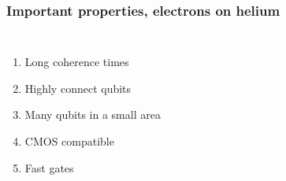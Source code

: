 \documentclass{beamer}
\begin{document}
\frame
    {
      \frametitle{Important properties, electrons on helium}
	
      \begin{footnotesize}
     \begin{columns}
       \column{5.0cm}
\begin{enumerate}
\item Long coherence times

\item Highly connect qubits

\item Many qubits in a small area

\item CMOS compatible

\item Fast gates
\end{enumerate}

\column{6cm}
      \begin{center}
      \end{center}
\end{columns}
      \end{footnotesize}
    }
\end{document}
